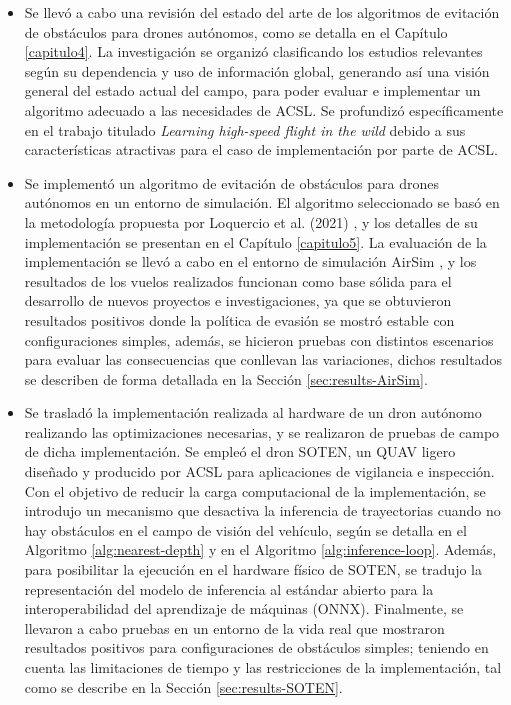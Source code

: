 \begin{itemize}
\item{
    Se llevó a cabo una revisión del estado del arte de los algoritmos de evitación de obstáculos para drones autónomos, como se detalla en el Capítulo \ref{capitulo4}. La investigación se organizó clasificando los estudios relevantes según su dependencia y uso de información global, generando así una visión general del estado actual del campo, para poder evaluar e implementar un algoritmo adecuado a las necesidades de ACSL. Se profundizó específicamente en el trabajo titulado \textit{Learning high-speed flight in the wild} \cite{Loquercio2021} debido a sus características atractivas para el caso de implementación por parte de ACSL.
}

\item{
    Se implementó un algoritmo de evitación de obstáculos para drones autónomos en un entorno de simulación. El algoritmo seleccionado se basó en la metodología propuesta por Loquercio et al. (2021) \cite{Loquercio2021}, y los detalles de su implementación se presentan en el Capítulo \ref{capitulo5}. La evaluación de la implementación se llevó a cabo en el entorno de simulación AirSim \cite{shah2018airsim}, y los resultados de los vuelos realizados funcionan como base sólida para el desarrollo de nuevos proyectos e investigaciones, ya que se obtuvieron resultados positivos donde la política de evasión se mostró estable con configuraciones simples, además, se hicieron pruebas con distintos escenarios para evaluar las consecuencias que conllevan las variaciones, dichos resultados se describen de forma detallada en la Sección \ref{sec:results-AirSim}.
}

\item{
    Se trasladó la implementación realizada al hardware de un dron autónomo realizando las optimizaciones necesarias, y se realizaron de pruebas de campo de dicha implementación. Se empleó el dron SOTEN, un QUAV ligero diseñado y producido por ACSL para aplicaciones de vigilancia e inspección. Con el objetivo de reducir la carga computacional de la implementación, se introdujo un mecanismo que desactiva la inferencia de trayectorias cuando no hay obstáculos en el campo de visión del vehículo, según se detalla en el Algoritmo \ref{alg:nearest-depth} y en el Algoritmo \ref{alg:inference-loop}. Además, para posibilitar la ejecución en el hardware físico de SOTEN, se tradujo la representación del modelo de inferencia al estándar abierto para la interoperabilidad del aprendizaje de máquinas (ONNX). Finalmente, se llevaron a cabo pruebas en un entorno de la vida real  que mostraron resultados positivos para configuraciones de obstáculos simples; teniendo en cuenta las limitaciones de tiempo y las restricciones de la implementación, tal como se describe en la Sección \ref{sec:results-SOTEN}.
}
\end{itemize}

